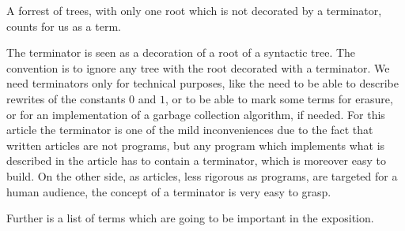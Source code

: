 \documentclass{article}
\begin{document}
A forrest of trees, with only one root which is not decorated by a terminator, counts for us as a term. 

The terminator is seen as a decoration of a root of a syntactic tree. The convention is to ignore any tree with the root decorated with a terminator. We need terminators only for technical purposes, like the need to be able to describe rewrites of the constants $0$ and $1$, or to be able to mark some terms for erasure, or for an implementation of a garbage collection algorithm, if needed. For this article the terminator is one of the mild inconveniences due to the fact that written articles are not programs, but any program which implements what is described in the article has to contain a terminator, which is moreover easy to build. On the other side, as articles, less rigorous as programs, are targeted for a human audience,  the concept of a terminator is very easy to grasp. 


 \vspace{.5cm}



Further is a list of terms which are going to be important in the exposition. 
\end{document}
